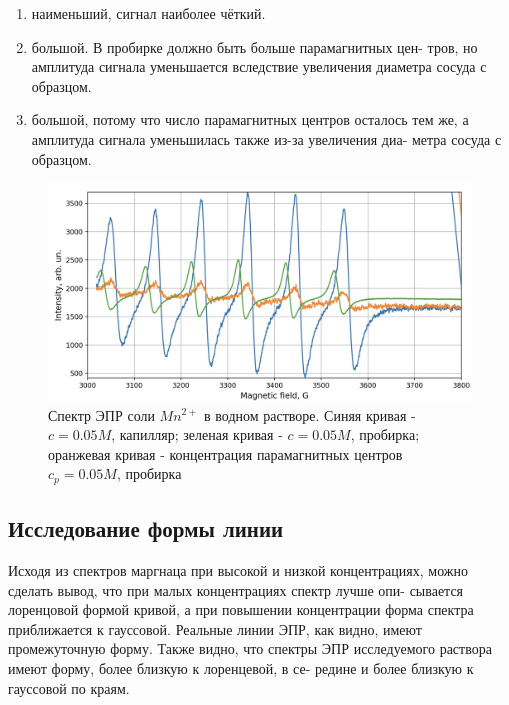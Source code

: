 \documentclass{article}
\begin{document}
\begin{enumerate}
\item наименьший, сигнал наиболее чёткий.

\item большой. В пробирке должно быть больше парамагнитных цен-
тров, но амплитуда сигнала уменьшается вследствие увеличения
диаметра сосуда с образцом.
\item большой, потому что число парамагнитных центров осталось тем
же, а амплитуда сигнала уменьшилась также из-за увеличения диа-
метра сосуда с образцом.

\end{enumerate}


\begin{figure}[h!]
        \centering
        \includegraphics[scale = 0.2]{4.jpeg}
        \caption{Спектр ЭПР соли $Mn^{2+}$ в водном растворе. Синяя кривая - $c = 0.05 M$, капилляр; зеленая кривая - $c = 0.05 M$, пробирка; оранжевая кривая - концентрация парамагнитных центров $c_p = 0.05 M$, пробирка}
        \label{4}
    \end{figure}

    
\subsection{Исследование формы линии}

Исходя из спектров маргнаца при высокой и низкой концентрациях,
можно сделать вывод, что при малых концентрациях спектр лучше опи-
сывается лоренцовой формой кривой, а при повышении концентрации
форма спектра приближается к гауссовой. Реальные линии ЭПР, как
видно, имеют промежуточную форму. Также видно, что спектры ЭПР
исследуемого раствора имеют форму, более близкую к лоренцевой, в се-
редине и более близкую к гауссовой по краям.

\newpage
\end{document}
